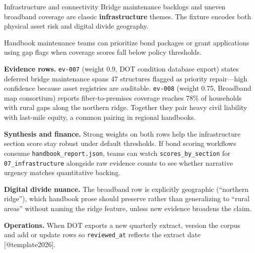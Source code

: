 \documentclass[
  ignorenonframetext,
]{beamer}
\author{\texorpdfstring{}{}}
\date{}
\begin{document}
\begin{frame}[fragile]{Infrastructure and connectivity}
\protect{}\label{infrastructure-and-connectivity}
Bridge maintenance backlogs and uneven broadband coverage are classic
\textbf{infrastructure} themes. The fixture encodes both physical asset
risk and digital divide geography.

Handbook maintenance teams can prioritize bond packages or grant
applications using gap flags when coverage scores fall below policy
thresholds.

\textbf{Evidence rows.} \texttt{ev-007} (weight 0.9, DOT condition
database export) states deferred bridge maintenance spans 47 structures
flagged as priority repair---high confidence because asset registries
are auditable. \texttt{ev-008} (weight 0.75, Broadband map consortium)
reports fiber-to-premises coverage reaches 78\% of households with rural
gaps along the northern ridge. Together they pair heavy civil liability
with last-mile equity, a common pairing in regional handbooks.

\textbf{Synthesis and finance.} Strong weights on both rows help the
infrastructure section score stay robust under default thresholds. If
bond scoring workflows consume \texttt{handbook\_report.json}, teams can
watch \texttt{scores\_by\_section} for \texttt{07\_infrastructure}
alongside raw evidence counts to see whether narrative urgency matches
quantitative backing.

\textbf{Digital divide nuance.} The broadband row is explicitly
geographic (``northern ridge''), which handbook prose should preserve
rather than generalizing to ``rural areas'' without naming the ridge
feature, unless new evidence broadens the claim.

\textbf{Operations.} When DOT exports a new quarterly extract, version
the corpus and add or update rows so \texttt{reviewed\_at} reflects the
extract date {[}@template2026{]}.
\end{frame}
\end{document}
